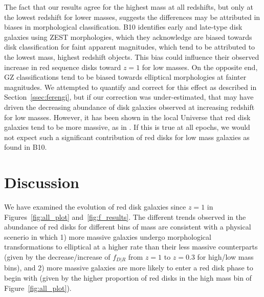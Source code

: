 \documentclass[useAMS,usenatbib]{mn2e}
\begin{document}
The fact that our results agree for the highest mass at all redshifts, but only at the lowest redshift for lower masses, suggests the differences may be attributed in biases in morphological classification. B10 identifies early and late-type disk galaxies using ZEST \citep{Scarlata2007} morphologies, which they acknowledge are biased towards disk classification for faint apparent magnitudes, which tend to be attributed to the lowest mass, highest redshift objects. This bias could influence their observed increase in red sequence disks toward $z=1$ for low masses. On the opposite end, GZ classifications tend to be biased towards elliptical morphologies at fainter magnitudes. We attempted to quantify and correct for this effect as described in Section~\ref{ssec:ferengi}, but if our correction was under-estimated, that may have driven the decreasing abundance of disk galaxies observed at increasing redshift for low masses. However, it has been shown in the local Universe that red disk galaxies tend to be more massive, as in \citet{Masters2011}. If this is true at all epochs, we would not expect such a significant contribution of red disks for low mass galaxies as found in B10.

\section{Discussion}
We have examined the evolution of red disk galaxies since $z=1$ in Figures~\ref{fig:all_plot} and~\ref{fig:f_results}. The different trends observed in the abundance of red disks for different bins of mass are consistent with a physical scenerio in which 1) more massive galaxies undergo morphological transformations to elliptical at a higher rate than their less massive counterparts (given by the decrease/increase of $f_{D|R}$ from $z=1$ to $z=0.3$ for high/low mass bins), and 2) more massive galaxies are more likely to enter a red disk phase to begin with (given by the higher proportion of red disks in the high mass bin of Figure~\ref{fig:all_plot}). 
\end{document}
